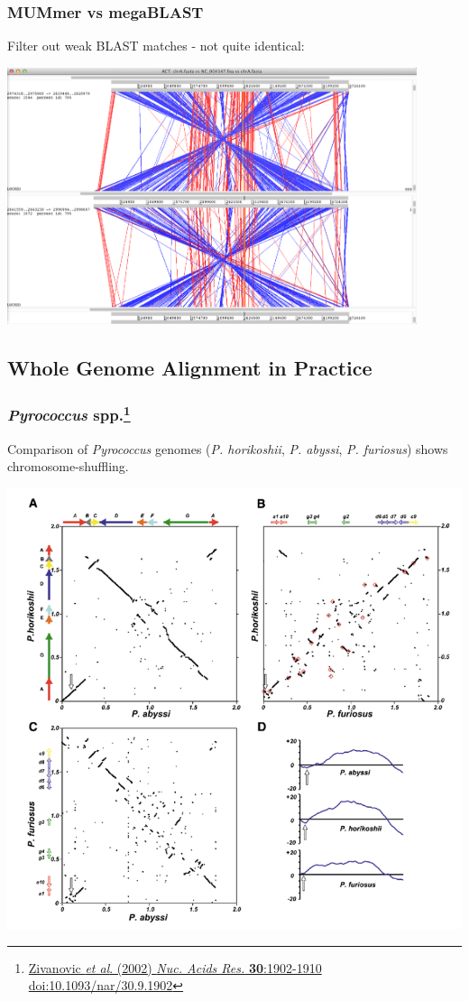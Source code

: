 \begin{frame}
  \frametitle{MUMmer vs megaBLAST}
  Filter out weak BLAST matches - not quite identical:
  \begin{center}
    \includegraphics[width=0.9\textwidth]{images/act_wgs10}
  \end{center}    
\end{frame}

\subsection{Whole Genome Alignment in Practice}

\begin{frame}
  \frametitle{\textit{Pyrococcus} spp.\footnote{\tiny{\href{http://dx.doi.org/10.1093/nar/30.9.1902}{Zivanovic \textit{et al}. (2002) \textit{Nuc. Acids Res.} \textbf{30}:1902-1910 doi:10.1093/nar/30.9.1902}}}}
  Comparison of \textit{Pyrococcus} genomes (\textit{P. horikoshii}, \textit{P. abyssi}, \textit{P. furiosus}) shows chromosome-shuffling.\\
  \begin{center}
    \includegraphics[height=0.65\textheight]{images/pyrococcus}
  \end{center}    
\end{frame}

